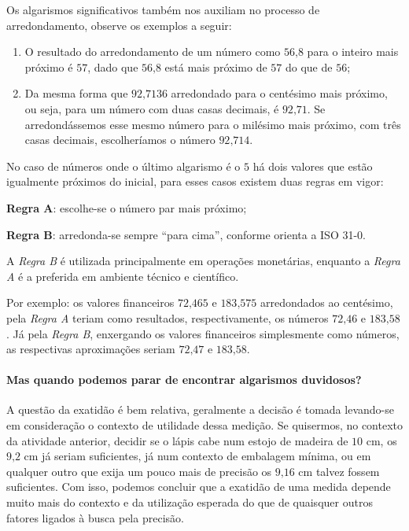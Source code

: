 \label{\detokenize{NO103-5:para-saber-mais-arredondamento}}
Os algarismos significativos também nos auxiliam no processo de arredondamento, observe os exemplos a seguir:
\begin{enumerate}
\item {} 
O resultado do arredondamento de um número como $56\text{,}8$ para o inteiro mais próximo é $57$, dado que $56\text{,}8$ está mais próximo de $57$ do que de $56$;

\item {} 
Da mesma forma que $92\text{,}7136$ arredondado para o centésimo mais próximo, ou seja, para um número com duas casas decimais, é $92\text{,}71$. Se arredondássemos esse mesmo número para o milésimo mais próximo, com três casas decimais, escolheríamos o número $92\text{,}714$.

\end{enumerate}

No caso de números onde o último algarismo é o $5$ há dois valores que estão igualmente próximos do inicial, para esses casos existem duas regras em vigor:

\textbf{Regra A}: escolhe-se o número par mais próximo;

\textbf{Regra B}: arredonda-se sempre “para cima”, conforme orienta a ISO 31-0.

A \emph{Regra B} é utilizada principalmente em operações monetárias, enquanto a \emph{Regra A} é a preferida em ambiente técnico e científico.

Por exemplo: os valores financeiros $72\text{,}465$ e $183\text{,}575$ arredondados ao centésimo, pela \emph{Regra A} teriam como resultados, respectivamente, os números $72\text{,}46$ e $183\text{,}58$. Já pela \emph{Regra B}, enxergando os valores financeiros simplesmente como números, as respectivas aproximações seriam $72\text{,}47$ e $183\text{,}58$.

\paragraph{Mas quando podemos parar de encontrar algarismos duvidosos?}

A questão da exatidão é bem relativa, geralmente a decisão é tomada levando-se em consideração o contexto de utilidade dessa medição. Se quisermos, no contexto da atividade anterior, decidir se o lápis cabe num estojo de madeira de $10$ cm, os $9\text{,}2$ cm já seriam suficientes, já num contexto de embalagem mínima, ou em qualquer outro que exija um pouco mais de precisão os $9\text{,}16$ cm talvez fossem suficientes. Com isso, podemos concluir que a exatidão de uma medida depende muito mais do contexto e da utilização esperada do que de quaisquer outros fatores ligados à busca pela precisão.

